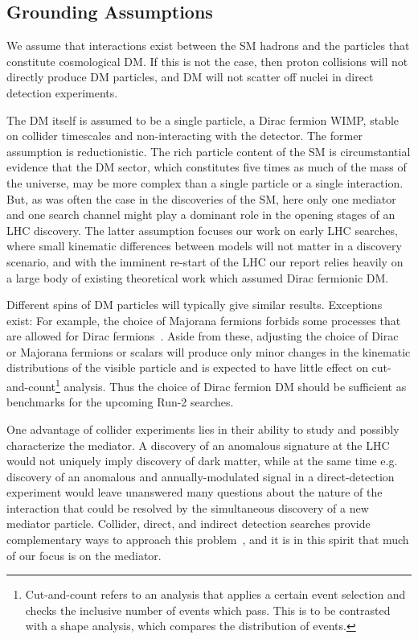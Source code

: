 \subsection{Grounding Assumptions}

We assume that interactions exist between the SM hadrons
and the particles that constitute cosmological DM. If this
is not the case, then proton collisions will not directly produce DM
particles, and DM will not scatter off nuclei in direct
detection experiments.

The DM itself is assumed to be a single particle, a Dirac
fermion WIMP, stable on collider timescales and non-interacting with
the detector.  
The former assumption is reductionistic.
The rich particle content of the SM is circumstantial evidence that
the DM sector, which constitutes five times as much of the
mass of the universe, may be more complex than a single particle or a
single interaction. But, as was often the case in the discoveries of
the SM, here only one mediator and one search channel might play a
dominant role in the opening stages of an LHC discovery. The latter
assumption focuses our work on early LHC searches, where small
kinematic differences between models will not matter in a discovery
scenario, and with the imminent re-start of the LHC our report relies
heavily on a large body of existing theoretical work which assumed Dirac fermionic DM. 

Different spins of DM particles will typically
give similar results. Exceptions exist: For example, the choice of Majorana fermions forbids some
processes that are allowed for Dirac fermions~\cite{Goodman:2010yf}.
Aside from these, adjusting the choice of Dirac or Majorana fermions or scalars will produce only minor changes
in the kinematic distributions of the visible particle and is expected to have little effect
on cut-and-count\footnote{Cut-and-count refers to an analysis
that applies a certain event selection and checks the inclusive number of events which pass. 
This is to be contrasted with a shape analysis, which compares the distribution of events.} analysis. Thus the choice of Dirac
fermion DM should be sufficient as benchmarks for the upcoming Run-2 searches. 

One advantage of collider experiments lies in their ability to study
and possibly characterize the mediator. A discovery of an anomalous
\MET signature at the LHC would not uniquely imply discovery of dark
matter, while at the same time e.g. discovery of an anomalous and
annually-modulated signal in a direct-detection experiment would leave
unanswered many questions about the nature of the interaction that
could be resolved by the simultaneous discovery of a new mediator
particle. Collider, direct, and indirect detection searches provide
complementary ways to approach this problem~\cite{Bauer:2013ihz}, and it is in this spirit
that much of our focus is on the mediator.

